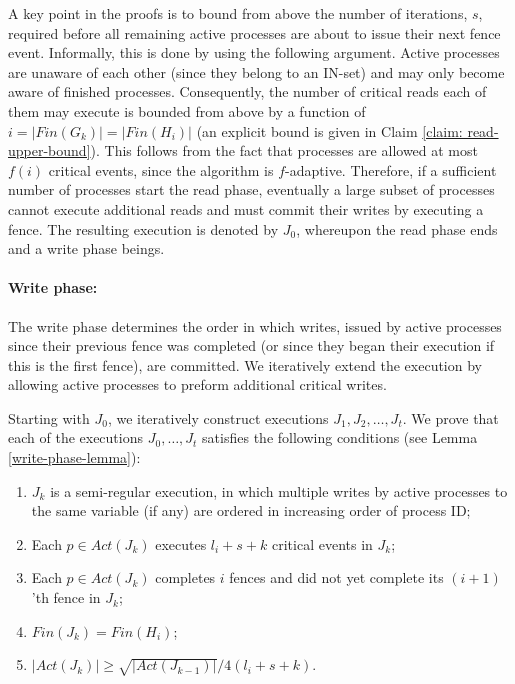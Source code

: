 A key point in the proofs is to bound from above the number of iterations, $s$, required before all remaining active processes are about to issue their next fence event. Informally, this is done by using the following argument. Active processes are unaware of each other (since they belong to an IN-set) and may only become aware of finished processes. Consequently, the number of critical reads each of them may execute is bounded from above by a function of $i=\vert {Fin}(G_k) \vert = \vert {Fin}(H_i) \vert$ (an explicit bound is given in Claim \ref{claim: read-upper-bound}). This follows from the fact that processes are allowed at most $f(i)$ critical events, since the algorithm is $f$-adaptive. Therefore, if a sufficient number of processes start the read phase, eventually a large subset of processes cannot execute additional reads and must commit their writes by executing a fence. The resulting execution is denoted by $J_0$, whereupon the read phase ends and a write phase beings.

\paragraph{Write phase:}
The write phase determines the order in which writes, issued by active processes since their previous fence was completed (or since they began their execution if this is the first fence), are committed. We iteratively extend the execution by allowing active processes to preform additional critical writes.

Starting with $J_0$, we iteratively construct executions $J_1,J_2,\ldots,J_t$. We prove that each of the executions $J_0, \ldots, J_t$  satisfies the following conditions (see Lemma \ref{write-phase-lemma}):

\begin{enumerate}[(1)]
	\item $J_k$ is a semi-regular execution, in which multiple writes by active processes to the same variable (if any) are ordered in increasing order of process ID;
	\item Each $p \in Act(J_k)$ executes $l_i+s+k$ critical events in $J_k$;
	\item Each $p\in Act(J_k)$ completes $i$ fences and did not yet complete its $(i+1)$'th fence in $J_k$;
	\item $Fin(J_k) = Fin(H_i)$;
	\item $|Act(J_k)| \geq \sqrt{|Act(J_{k-1})|}/4(l_i+s+k)$.
\end{enumerate}


